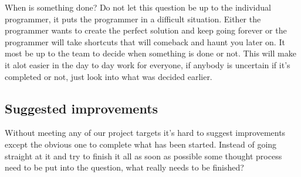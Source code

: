 When is something done?
Do not let this question be up to the individual programmer, it puts the programmer in a difficult situation.
Either the programmer wants to create the perfect solution and keep going forever or the programmer will take shortcuts that will comeback and haunt you later on.
It most be up to the team to decide when something is done or not.
This will make it alot easier in the day to day work for everyone, if anybody is uncertain if it's completed or not, just look into what was decided earlier.
\subsection{Suggested improvements}
Without meeting any of our project targets it's hard to suggest improvements except the obvious one to complete what has been started. 
Instead of going straight at it and try to finish it all as soon as possible some thought process need to be put into the question, what really needs to be finished?

%
%
